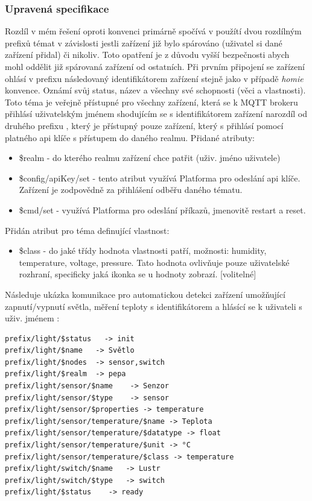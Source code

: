 \subsubsection{Upravená specifikace}
Rozdíl v mém řešení oproti  konvenci primárně spočívá v použítí dvou rozdílným prefixů témat v závislosti jestli zařízení již bylo spárováno (uživatel si dané zařízení přidal) či nikoliv. Toto opatření je z důvodu vyšší bezpečnosti abych mohl oddělit již spárovaná zařízení od ostatních. Při prvním připojení se zařízení ohlásí v prefixu  následovaný identifikátorem zařízení stejně jako v případě \textit{homie} konvence. Oznámí svůj status, název a všechny své schopnosti (věci a vlastnosti). Toto téma je veřejně přístupné pro všechny zařízení, která se k MQTT brokeru přihlásí uživatelským jménem shodujícím se s identifikátorem zařízení narozdíl od druhého prefixu , který je přístupný pouze zařízení, který s přihlásí pomocí platného api klíče s přístupem do daného realmu. Přidané atributy:
\begin{itemize}
    \item \$realm - do kterého realmu zařízení chce patřit (uživ. jméno uživatele)
    \item \$config/apiKey/set - tento atribut využívá Platforma pro odeslání api klíče. Zařízení je zodpovědně za přihlášení odběřu daného tématu.
    \item \$cmd/set - využívá Platforma pro odeslání příkazů, jmenovitě restart a reset.
\end{itemize}

Přidán atribut pro téma definující vlastnost:
\begin{itemize}
    \item \$class - do jaké třídy hodnota vlastnosti patří, možnosti: humidity, temperature, voltage, pressure. Tato hodnota ovlivňuje pouze uživatelské rozhraní, specificky jaká ikonka se u hodnoty zobrazí. [volitelné]
\end{itemize}


Následuje ukázka komunikace pro automatickou detekci zařízení umožňující zapnutí/vypnutí světla, měření teploty s identifikátorem  a hlásící se k uživateli s uživ. jménem :
\begin{verbatim}
prefix/light/$status   -> init
prefix/light/$name   -> Světlo
prefix/light/$nodes  -> sensor,switch
prefix/light/$realm  -> pepa
prefix/light/sensor/$name    -> Senzor
prefix/light/sensor/$type    -> sensor
prefix/light/sensor/$properties -> temperature
prefix/light/sensor/temperature/$name -> Teplota
prefix/light/sensor/temperature/$datatype -> float
prefix/light/sensor/temperature/$unit -> °C
prefix/light/sensor/temperature/$class -> temperature
prefix/light/switch/$name   -> Lustr
prefix/light/switch/$type   -> switch
prefix/light/$status    -> ready
\end{verbatim}

